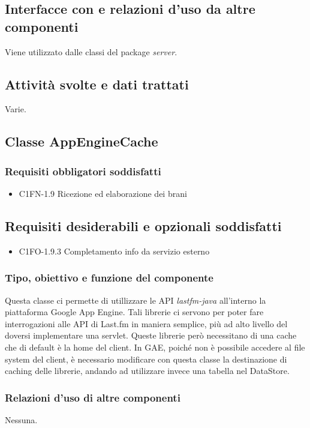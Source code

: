 \subsection*{Interfacce con e relazioni d'uso da altre componenti}
Viene utilizzato dalle classi del package \emph{server}.
\subsection*{Attivit\`a svolte e dati trattati}
Varie.

\subsection{Classe AppEngineCache}
\subsubsection*{Requisiti obbligatori soddisfatti}
\begin{itemize}
    \item C1FN-1.9 Ricezione ed elaborazione dei brani
\end{itemize}
\subsection*{Requisiti desiderabili e opzionali soddisfatti}
\begin{itemize}
    \item C1FO-1.9.3 Completamento info da servizio esterno
\end{itemize}
\subsubsection*{Tipo, obiettivo e funzione del componente}
Questa classe ci permette di utillizzare le API \emph{lastfm-java} all'interno la
piattaforma Google App Engine. Tali librerie ci servono per poter fare
interrogazioni alle API di Last.fm in maniera semplice, pi\`u ad alto livello
del doversi implementare una servlet. Queste librerie per\`o necessitano di una
cache che di default \`e la home del client. In GAE, poich\'e non \`e possibile
accedere al file system del client, \`e necessario modificare con questa classe
 la destinazione di caching delle librerie, andando ad
utilizzare invece una tabella nel DataStore.
\subsubsection*{Relazioni d'uso di altre componenti}
Nessuna.
